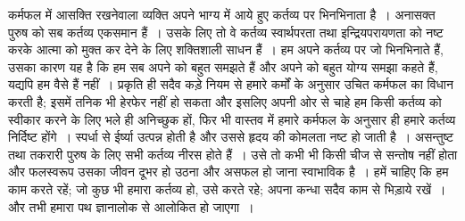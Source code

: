 कर्मफल में आसक्ति रखनेवाला व्यक्ति अपने भाग्य में आये हुए कर्तव्य पर भिनभिनाता है~। अनासक्त पुरुष को सब कर्तव्य एकसमान हैं~। उसके लिए तो वे कर्तव्य स्वार्थपरता तथा इन्द्रियपरायणता को नष्ट करके आत्मा को मुक्त कर देने के लिए शक्तिशाली साधन हैं~। हम अपने कर्तव्य पर जो भिनभिनाते हैं, उसका कारण यह है कि हम सब अपने को बहुत समझते हैं और अपने को बहुत योग्य समझा कहते हैं, यद्यपि हम वैसे हैं नहीं~। प्रकृति ही सदैव कड़े नियम से हमारे कर्मों के अनुसार उचित कर्मफल का विधान करती है; इसमें तनिक भी हेरफेर नहीं हो सकता और इसलिए अपनी ओर से चाहे हम किसी कर्तव्य को स्वीकार करने के लिए भले ही अनिच्छुक हों, फिर भी वास्तव में हमारे कर्मफल के अनुसार ही हमारे कर्तव्य निर्दिष्ट होंगे~। स्पर्धा से ईर्ष्या उत्पन्न होती है और उससे हृदय की कोमलता नष्ट हो जाती है~। असन्तुष्ट तथा तकरारी पुरुष के लिए सभी कर्तव्य नीरस होते हैं~। उसे तो कभी भी किसी चीज से सन्तोष नहीं होता और फलस्वरूप उसका जीवन दूभर हो उठना और असफल हो जाना स्वाभाविक है~। हमें चाहिए कि हम काम करते रहें; जो कुछ भी हमारा कर्तव्य हो, उसे करते रहे; अपना कन्धा सदैव काम से भिड़ाये रखें~। और तभी हमारा पथ ज्ञानालोक से आलोकित हो जाएगा~।

